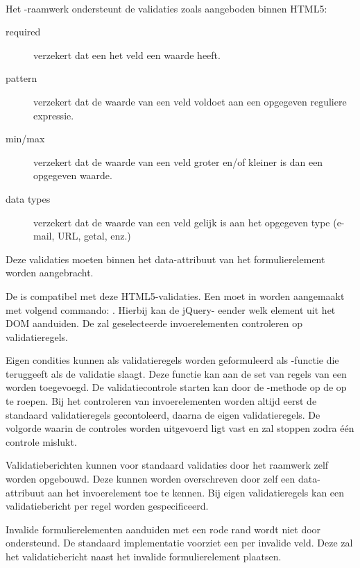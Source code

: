 \paragraph{\kendo}
Het \kendo{}-raamwerk ondersteunt de validaties zoals aangeboden binnen HTML5:
\begin{description}
  \item [required] verzekert dat een het veld een waarde heeft.
  \item [pattern] verzekert dat de waarde van een veld voldoet aan een opgegeven reguliere expressie.
  \item [min/max] verzekert dat de waarde van een veld groter en/of kleiner is dan een opgegeven waarde.
  \item [data types] verzekert dat de waarde van een veld gelijk is aan het opgegeven type (e-mail, URL, getal, enz.)
\end{description}
Deze validaties moeten binnen het data-attribuut van het formulierelement worden aangebracht.

De \kendo{}  is compatibel met deze HTML5-validaties.
Een  moet in \js{} worden aangemaakt met volgend commando:  \newline
{}.
Hierbij kan de jQuery- eender welk element uit het DOM aanduiden.
De  zal geselecteerde invoerelementen controleren op validatieregels.

Eigen condities kunnen als validatieregels worden geformuleerd als \js-functie die  teruggeeft als de validatie slaagt.
Deze functie kan aan de set van regels van een  worden toegevoegd.
De validatiecontrole starten kan door de -methode op de  op te roepen.
Bij het controleren van invoerelementen worden altijd eerst de standaard validatieregels gecontoleerd,  daarna de eigen validatieregels.
De volgorde waarin de controles worden uitgevoerd ligt vast en zal stoppen zodra één controle mislukt.

Validatieberichten kunnen voor standaard validaties door het raamwerk zelf worden opgebouwd.
Deze kunnen worden overschreven door zelf een data-attribuut  aan het invoerelement toe te kennen.
Bij eigen validatieregels kan een validatiebericht per regel worden gespecificeerd.

Invalide formulierelementen aanduiden met een rode rand wordt niet door \kendo{} ondersteund.
De standaard implementatie voorziet een  per invalide veld.
Deze zal het validatiebericht naast het invalide formulierelement plaatsen. 


